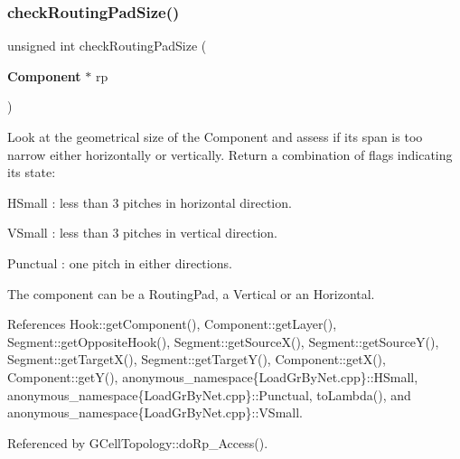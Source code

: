 \subsubsection{\texorpdfstring{check\+Routing\+Pad\+Size()}{checkRoutingPadSize()}}
{\footnotesize\ttfamily unsigned int check\+Routing\+Pad\+Size (\begin{DoxyParamCaption}\item[{\textbf{ Component} $\ast$}]{rp }\end{DoxyParamCaption})}

Look at the geometrical size of the Component and assess if it\textquotesingle{}s span is too narrow either horizontally or vertically. Return a combination of flags indicating it\textquotesingle{}s state\+:
\begin{DoxyItemize}
\item H\+Small \+: less than 3 pitches in horizontal direction.
\item V\+Small \+: less than 3 pitches in vertical direction.
\item Punctual \+: one pitch in either directions.
\end{DoxyItemize}

The component can be a Routing\+Pad, a Vertical or an Horizontal.

 

References Hook\+::get\+Component(), Component\+::get\+Layer(), Segment\+::get\+Opposite\+Hook(), Segment\+::get\+Source\+X(), Segment\+::get\+Source\+Y(), Segment\+::get\+Target\+X(), Segment\+::get\+Target\+Y(), Component\+::get\+X(), Component\+::get\+Y(), anonymous\+\_\+namespace\{\+Load\+Gr\+By\+Net.\+cpp\}\+::\+H\+Small, anonymous\+\_\+namespace\{\+Load\+Gr\+By\+Net.\+cpp\}\+::\+Punctual, to\+Lambda(), and anonymous\+\_\+namespace\{\+Load\+Gr\+By\+Net.\+cpp\}\+::\+V\+Small.



Referenced by G\+Cell\+Topology\+::do\+Rp\+\_\+\+Access().

\mbox{\label{group__LoadGlobalRouting_gae9cae408ea16a3f7c77c3d75f0242f19}} 
